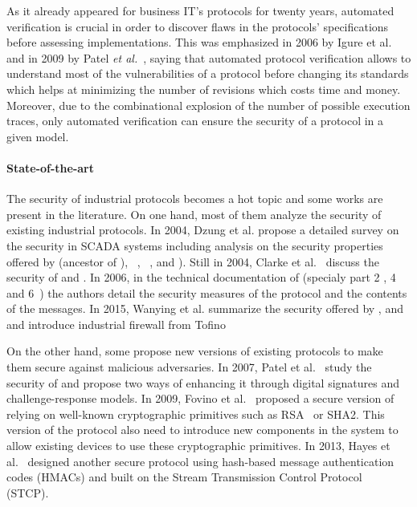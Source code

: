 As it already appeared for business IT's protocols for twenty years, automated
verification is crucial in order to discover flaws in the protocols'
specifications before assessing implementations.  This was emphasized
in 2006 by Igure et al.~\cite{ILW06} and in 2009 by Patel \emph{et
al.}~\cite{PBG09}, saying that automated protocol verification allows
to understand most of the vulnerabilities of a protocol before
changing its standards which helps at minimizing the number of
revisions which costs time and money.  Moreover, due to the
combinational explosion of the number of possible execution traces,
only automated verification can ensure the security of a protocol in a
given model.

\paragraph{State-of-the-art}\label{sec:intro_sota}

The security of industrial protocols becomes a hot topic and some works are
present in the literature.
On one hand, most of them analyze the security of existing industrial protocols.
In 2004, Dzung et al. propose a detailed survey on the security in SCADA systems
including analysis on the security properties offered by \opc (ancestor of
\opcua), \mms~\cite{ISO_MMS}, ~\cite{IEC_61850}, \iccp
\cite{IEC_60870} and \etherip).
Still in 2004, Clarke et al.~\cite{CR04} discuss the security of \dnp and
\iccp.
In 2006, in the technical documentation of \opcua (specialy part 2
\cite{opcua_part2}, 4~\cite{opcua_part4} and 6~\cite{opcua_part6}) the authors
detail the security measures of the protocol and the contents of the messages.
In 2015, Wanying et al. summarize the security offered by \modbus, \dnp and \opc
and introduce industrial firewall from Tofino~\cite{TOFINO}

On the other hand, some propose new versions of existing protocols to make them
secure against malicious adversaries.
In 2007, Patel et al.~\cite{PY07} study the security of \dnp and propose two
ways of enhancing it through digital signatures and challenge-response models.
In 2009, Fovino et al.~\cite{FCMT09} proposed a secure version of \modbus
relying on well-known cryptographic primitives such as RSA~\cite{RSA78} or SHA2.
This version of the protocol also need to introduce new components in the system
to allow existing devices to use these cryptographic primitives.
In 2013, Hayes et al.~\cite{HE13} designed another secure \modbus protocol using
hash-based message authentication codes (HMACs) and built on the Stream
Transmission Control Protocol~\cite{Ste07} (STCP).

